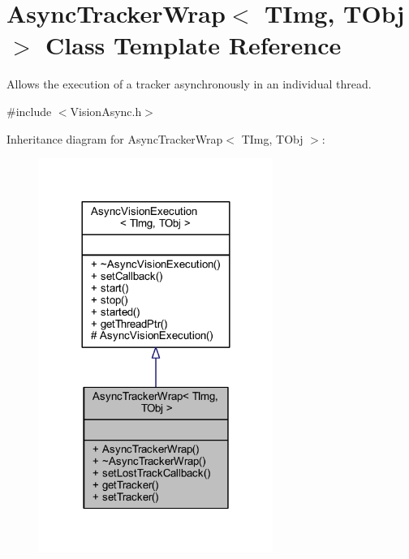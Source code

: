 \hypertarget{class_vision_core_1_1_async_1_1_async_tracker_wrap}{}\section{Async\+Tracker\+Wrap$<$ T\+Img, T\+Obj $>$ Class Template Reference}
\label{class_vision_core_1_1_async_1_1_async_tracker_wrap}


Allows the execution of a tracker asynchronously in an individual thread.  




{\ttfamily \#include $<$Vision\+Async.\+h$>$}



Inheritance diagram for Async\+Tracker\+Wrap$<$ T\+Img, T\+Obj $>$\+:
\nopagebreak
\begin{figure}[H]
\begin{center}
\leavevmode
\includegraphics[width=216pt]{class_vision_core_1_1_async_1_1_async_tracker_wrap__inherit__graph}
\end{center}
\end{figure}


